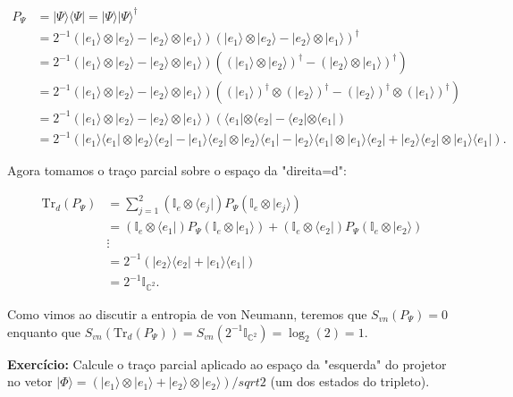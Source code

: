 \documentclass[11pt]{article}
\begin{document}
\begin{align}
P_{\Psi} &=|\Psi\rangle\langle\Psi| = |\Psi\rangle|\Psi\rangle^{\dagger}\\
& = 2^{-1}(|e_{1}\rangle\otimes|e_{2}\rangle-|e_{2}\rangle\otimes|e_{1}\rangle)(|e_{1}\rangle\otimes|e_{2}\rangle-|e_{2}\rangle\otimes|e_{1}\rangle)^{\dagger} \\
& = 2^{-1}(|e_{1}\rangle\otimes|e_{2}\rangle-|e_{2}\rangle\otimes|e_{1}\rangle)((|e_{1}\rangle\otimes|e_{2}\rangle)^{\dagger}-(|e_{2}\rangle\otimes|e_{1}\rangle)^{\dagger}) \\
& = 2^{-1}(|e_{1}\rangle\otimes|e_{2}\rangle-|e_{2}\rangle\otimes|e_{1}\rangle)((|e_{1}\rangle)^{\dagger}\otimes(|e_{2}\rangle)^{\dagger}-(|e_{2}\rangle)^{\dagger}\otimes(|e_{1}\rangle)^{\dagger}) \\
& = 2^{-1}(|e_{1}\rangle\otimes|e_{2}\rangle-|e_{2}\rangle\otimes|e_{1}\rangle)(\langle e_{1}|\otimes\langle e_{2}|-\langle e_{2}|\otimes\langle e_{1}|) \\
& = 2^{-1}(|e_{1}\rangle\langle e_{1}|\otimes|e_{2}\rangle\langle e_{2}| - |e_{1}\rangle\langle e_{2}|\otimes|e_{2}\rangle\langle e_{1}|  - |e_{2}\rangle\langle e_{1}|\otimes|e_{1}\rangle\langle e_{2}| + |e_{2}\rangle\langle e_{2}|\otimes|e_{1}\rangle\langle e_{1}|).
\end{align}

Agora tomamos o traço parcial sobre o espaço da "direita=d":

\begin{align}
\mathrm{Tr}_{d}(P_{\Psi}) & = \sum_{j=1}^{2}(\mathbb{I}_{e}\otimes\langle e_{j}|)P_{\Psi}(\mathbb{I}_{e}\otimes|e_{j}\rangle) \\
& = (\mathbb{I}_{e}\otimes\langle e_{1}|)P_{\Psi}(\mathbb{I}_{e}\otimes|e_{1}\rangle) + (\mathbb{I}_{e}\otimes\langle e_{2}|)P_{\Psi}(\mathbb{I}_{e}\otimes|e_{2}\rangle) \\
& \vdots \\
& = 2^{-1}(|e_{2}\rangle\langle e_{2}|+|e_{1}\rangle\langle e_{1}|) \\
& = 2^{-1}\mathbb{I}_{\mathbb{C}^{2}}.
\end{align}

Como vimos ao discutir a entropia de von Neumann, teremos que
\(S_{vn}(P_{\Psi})=0\) enquanto que
\(S_{vn}(\mathrm{Tr}_{d}(P_{\Psi}))=S_{vn}(2^{-1}\mathbb{I}_{\mathbb{C}^{2}})=\log_{2}(2)=1\).

\textbf{Exercício:} Calcule o traço parcial aplicado ao espaço da
"esquerda" do projetor no vetor
\(|\Phi\rangle=(|e_{1}\rangle\otimes|e_{1}\rangle+|e_{2}\rangle\otimes|e_{2}\rangle)/sqrt{2}\)
(um dos estados do tripleto).
\end{document}
